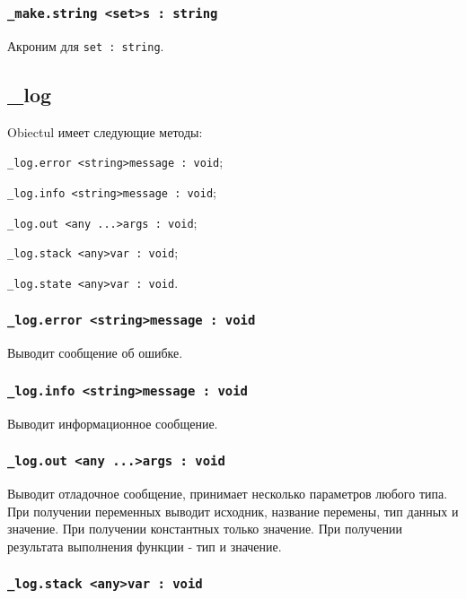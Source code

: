 \subsubsection{\lstinline|_make.string <set>s : string|}

Акроним для \lstinline|set : string|.

\subsection{{\color{orange} \_log}}

Obiectul \logtype{} имеет следующие методы:
\begin{icItems}
	\item \lstinline|_log.error <string>message : void|;
	\item \lstinline|_log.info <string>message : void|;
	\item \lstinline|_log.out <any ...>args : void|;
	\item \lstinline|_log.stack <any>var : void|;
	\item \lstinline|_log.state <any>var : void|.
\end{icItems}

\subsubsection{\lstinline|_log.error <string>message : void|}

Выводит сообщение об ошибке.

\subsubsection{\lstinline|_log.info <string>message : void|}

Выводит информационное сообщение.

\subsubsection{\lstinline|_log.out <any ...>args : void|}

Выводит отладочное сообщение, принимает несколько параметров любого типа. При получении переменных выводит исходник, название перемены, тип данных и значение. При получении константных только значение. При получении результата выполнения функции - тип и значение. 

\subsubsection{\lstinline|_log.stack <any>var : void|}

